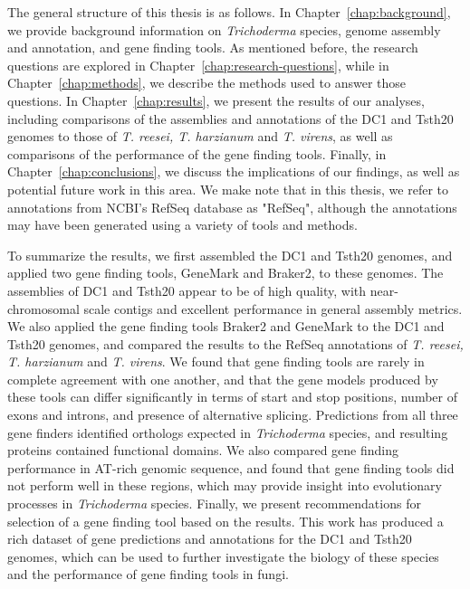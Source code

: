 The general structure of this thesis is as follows. In Chapter~\ref{chap:background}, we provide background information on \textit{Trichoderma} species, genome assembly and annotation, and gene finding tools. As mentioned before, the research questions are explored in Chapter~\ref{chap:research-questions}, while in Chapter~\ref{chap:methods}, we describe the methods used to answer those questions. In Chapter~\ref{chap:results}, we present the results of our analyses, including comparisons of the assemblies and annotations of the DC1 and Tsth20 genomes to those of \textit{T. reesei, T. harzianum} and \textit{T. virens}, as well as comparisons of the performance of the gene finding tools. Finally, in Chapter~\ref{chap:conclusions}, we discuss the implications of our findings, as well as potential future work in this area. We make note that in this thesis, we refer to annotations from NCBI's RefSeq database as "RefSeq", although the annotations may have been generated using a variety of tools and methods. 

  To summarize the results, we first assembled the DC1 and Tsth20 genomes, and applied two gene finding tools, GeneMark and Braker2, to these genomes. The assemblies of DC1 and Tsth20 appear to be of high quality, with near-chromosomal scale contigs and excellent performance in general assembly metrics. We also applied the gene finding tools Braker2 and GeneMark to the DC1 and Tsth20 genomes, and compared the results to the RefSeq annotations of \textit{T. reesei, T. harzianum} and \textit{T. virens}. We found that gene finding tools are rarely in complete agreement with one another, and that the gene models produced by these tools can differ significantly in terms of start and stop positions, number of exons and introns, and presence of alternative splicing. Predictions from all three gene finders identified orthologs expected in \textit{Trichoderma} species, and resulting proteins contained functional domains. We also compared gene finding performance in AT-rich genomic sequence, and found that gene finding tools did not perform well in these regions, which may provide insight into evolutionary processes in \textit{Trichoderma} species. Finally, we present recommendations for selection of a gene finding tool based on the results. This work has produced a rich dataset of gene predictions and annotations for the DC1 and Tsth20 genomes, which can be used to further investigate the biology of these species and the performance of gene finding tools in fungi.